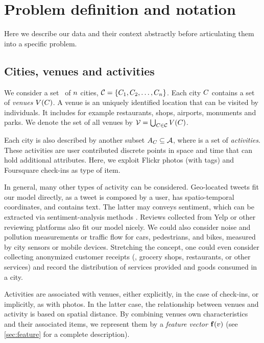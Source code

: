 \section{Problem definition and notation}
\label{sec:problem}

Here we describe our data and their context abstractly before articulating them
into a specific problem.

\subsection{Cities, venues and activities}
We consider a set \cities\ of ${n}$ cities, 
${\cal C}=\{{C}_1, {C}_2, \ldots,{C}_{{n}}\}$.
Each city ${C}$ contains a set of \emph{venues} ${V}({C})$.
A venue is an uniquely identified location that can be visited by individuals.
It includes for example restaurants, shops, airports, monuments and parks.
We denote the set of all venues by ${\cal V} = \bigcup_{{C}\in{\cal C}} {V}({C})$.

Each city \city{} is also described by another subset $A_{{C}} \subseteq
{\cal A}$, where \activities{} is a set of \emph{activities}.  These
activities are user contributed discrete points in space and time that can hold
additional attributes. Here, we exploit Flickr photos (with tags) and
Foursquare check-ins as type of item.

In general, many other types of activity can be considered.  Geo-located tweets
fit our model directly, as a tweet is composed by a user, has spatio-temporal
coordinates, and contains text. The latter may conveys sentiment, which can be
extracted via sentiment-analysis methods \autocite{SentimentAnalysis08}.
Reviews collected from Yelp or other reviewing platforms also fit our model
nicely.  We could also consider noise and pollution measurements or traffic
flow for cars, pedestrians, and bikes, measured by city sensors or mobile
devices.  Stretching the concept, one could even consider collecting anonymized
customer receipts (\eg{}, grocery shops, restaurants, or other services) and
record the distribution of services provided and goods consumed in a city.

Activities are associated with venues, either explicitly, in the case of
check-ins, or implicitly, as with photos. In the latter case, the relationship
between venues and activity is based on spatial distance.  By combining venues
own characteristics and their associated items, we represent them by a {\em
feature vector} ${\mathbf{f}}({v})$ (see \autoref{sec:feature}
 for a complete description).


